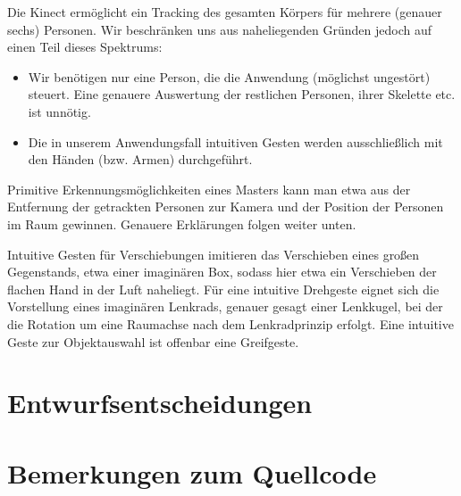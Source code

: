 \documentclass[12pt,a4paper]{article}
\begin{document}
	Die Kinect ermöglicht ein Tracking des gesamten Körpers für mehrere (genauer sechs) Personen. Wir beschränken uns aus naheliegenden Gründen jedoch auf einen Teil dieses Spektrums:
	\begin{itemize}
		\item Wir benötigen nur eine Person, die die Anwendung (möglichst ungestört) steuert. Eine genauere Auswertung der restlichen Personen, ihrer Skelette etc. ist unnötig.
		\item Die in unserem Anwendungsfall intuitiven Gesten werden ausschließlich mit den Händen (bzw. Armen) durchgeführt.
	\end{itemize}
	Primitive Erkennungsmöglichkeiten eines Masters kann man etwa aus der Entfernung der getrackten Personen zur Kamera und der Position der Personen im Raum gewinnen. Genauere Erklärungen folgen weiter unten.\par 
	Intuitive Gesten für Verschiebungen imitieren das Verschieben eines großen Gegenstands, etwa einer imaginären Box, sodass hier etwa ein Verschieben der flachen Hand in der Luft naheliegt. Für eine intuitive Drehgeste eignet sich die Vorstellung eines imaginären Lenkrads, genauer gesagt einer Lenkkugel, bei der die Rotation um eine Raumachse nach dem Lenkradprinzip erfolgt. Eine intuitive Geste zur Objektauswahl ist offenbar eine Greifgeste.
\section{Entwurfsentscheidungen}
	
	
%
%
\section{Bemerkungen zum Quellcode}
	
	
	

\newpage
\printbibliography
\end{document}
